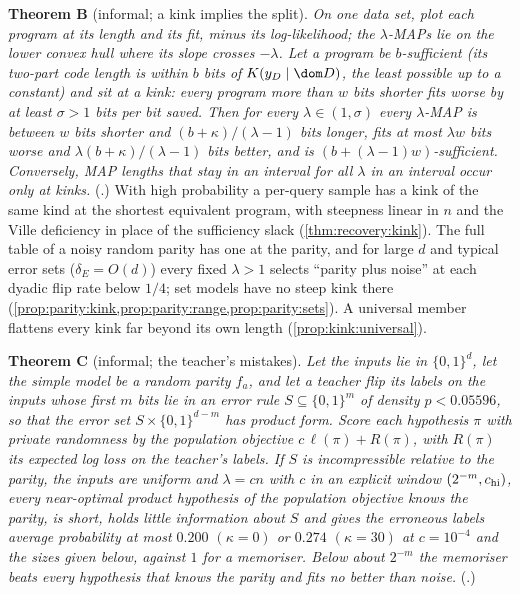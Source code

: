 \smallskip\noindent\textbf{Theorem B} (informal; a kink implies the split). \emph{On one data set, plot each program at its length and its fit, minus its log-likelihood; the $\lambda$-MAPs lie on the lower convex hull where its slope crosses $-\lambda$. Let a program be $b$-sufficient (its two-part code length is within $b$ bits of $K(y_D\mid\dom D)$, the least possible up to a constant) and sit at a kink: every program more than $w$ bits shorter fits worse by at least $\sigma>1$ bits per bit saved. Then for every $\lambda\in(1,\sigma)$ every $\lambda$-MAP is between $w$ bits shorter and $(b+\kappa)/(\lambda-1)$ bits longer, fits at most $\lambda w$ bits worse and $\lambda(b+\kappa)/(\lambda-1)$ bits better, and is $(b+(\lambda-1)w)$-sufficient. Conversely, MAP lengths that stay in an interval for all $\lambda$ in an interval occur only at kinks.} (.) With high probability a per-query sample has a kink of the same kind at the shortest equivalent program, with steepness linear in $n$ and the Ville deficiency in place of the sufficiency slack (\cref{thm:recovery:kink}). The full table of a noisy random parity has one at the parity, and for large $d$ and typical error sets ($\delta_E=O(d)$) every fixed $\lambda>1$ selects ``parity plus noise'' at each dyadic flip rate below $1/4$; set models have no steep kink there (\cref{prop:parity:kink,prop:parity:range,prop:parity:sets}). A universal member flattens every kink far beyond its own length (\cref{prop:kink:universal}).

\smallskip\noindent\textbf{Theorem C} (informal; the teacher's mistakes). \emph{Let the inputs lie in $\{0,1\}^d$, let the simple model be a random parity $f_a$, and let a teacher flip its labels on the inputs whose first $m$ bits lie in an error rule $S\subseteq\{0,1\}^m$ of density $p<0.05596$, so that the error set $S\times\{0,1\}^{d-m}$ has product form. Score each hypothesis $\pi$ with private randomness by the population objective $c\,\ell(\pi)+R(\pi)$, with $R(\pi)$ its expected log loss on the teacher's labels. If $S$ is incompressible relative to the parity, the inputs are uniform and $\lambda=cn$ with $c$ in an explicit window $(2^{-m},c_{\rm hi})$, every near-optimal product hypothesis of the population objective knows the parity, is short, holds little information about $S$ and gives the erroneous labels average probability at most $0.200$ $(\kappa=0)$ or $0.274$ $(\kappa=30)$ at $c=10^{-4}$ and the sizes given below, against $1$ for a memoriser. Below about $2^{-m}$ the memoriser beats every hypothesis that knows the parity and fits no better than noise.} (.)

